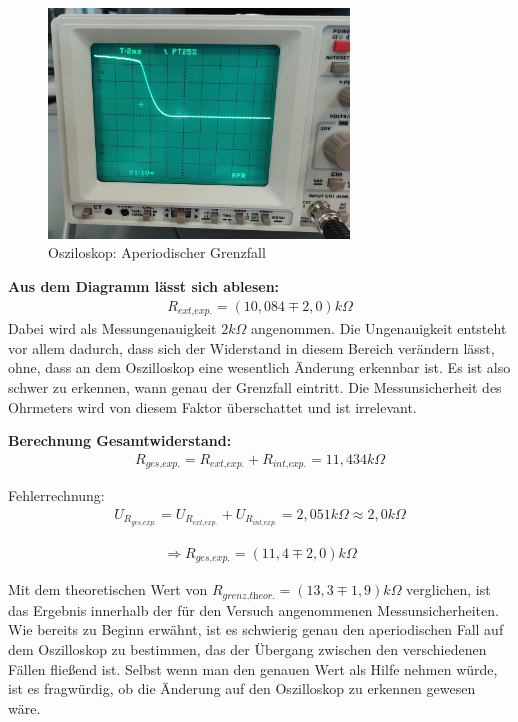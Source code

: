 \documentclass[a4paper]{scrartcl}
\numberwithin{equation}{subsection}
\begin{document}
\begin{figure}[H]
\includegraphics[width=8cm]{Bild_Osziloskop-Grenzfall}
\centering
\caption{Osziloskop: Aperiodischer Grenzfall}
\centering
\end{figure}

\textbf{Aus dem Diagramm lässt sich ablesen:}
\begin{align*}
R_{\textit{ext,exp.}} = (10,084\mp2,0)k\Omega
\end{align*}
Dabei wird als Messungenauigkeit $2k\Omega$ angenommen. Die Ungenauigkeit entsteht vor allem dadurch, dass sich der Widerstand in diesem Bereich verändern lässt, ohne, dass an dem Oszilloskop eine wesentlich Änderung erkennbar ist. Es ist also schwer zu erkennen, wann genau der Grenzfall eintritt.
Die Messunsicherheit des Ohrmeters wird von diesem Faktor überschattet und ist irrelevant.

\textbf{Berechnung Gesamtwiderstand:}
\begin{align}
R_{\textit{ges,exp.}} = R_{\textit{ext,exp.}} + R_{\textit{int,exp.}} = 11,434k\Omega 
\end{align}

Fehlerrechnung:
\begin{align*}
U_{R_{\textit{ges,exp.}}} = U_{R_{\textit{ext,exp.}}} + U_{R_{\textit{int,exp.}}} = 2,051k\Omega \approx 2,0k\Omega
\end{align*}

\begin{align*}
\Rightarrow R_{\textit{ges,exp.}} = (11,4 \mp 2,0) k\Omega
\end{align*}

Mit dem theoretischen Wert von $R_{\textit{grenz,theor.}} = (13,3 \mp 1,9)k \Omega$ verglichen, ist das Ergebnis innerhalb der für den Versuch angenommenen Messunsicherheiten. Wie bereits zu Beginn erwähnt, ist es schwierig genau den aperiodischen Fall auf dem Oszilloskop zu bestimmen, das der Übergang zwischen den verschiedenen Fällen fließend ist. Selbst wenn man den genauen Wert als Hilfe nehmen würde, ist es fragwürdig, ob die Änderung auf den Oszilloskop zu erkennen gewesen wäre.
\end{document}
